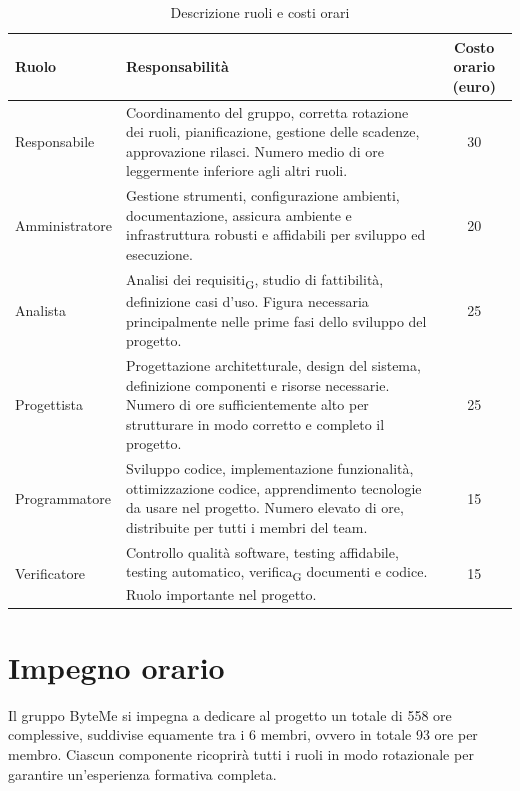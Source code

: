 \documentclass[11pt,a4paper]{article}
\newcommand{\gls}[1]{#1\textsubscript{G}}
\begin{document}
\begin{table}[H]
    \centering
    \begin{tabular}{|p{}|p{}|c|}
        \hline
        \textbf{Ruolo} & \textbf{Responsabilità} & \textbf{Costo orario (euro)} \\
        \hline
        Responsabile & Coordinamento del gruppo, corretta rotazione dei ruoli, pianificazione, gestione delle scadenze, approvazione rilasci. Numero medio di ore leggermente inferiore agli altri ruoli. & 30 \\
        \hline
        Amministratore & Gestione strumenti, configurazione ambienti, documentazione, assicura ambiente e infrastruttura robusti e affidabili per sviluppo ed esecuzione. & 20 \\
        \hline
        Analista & \gls{Analisi dei requisiti}, studio di fattibilità, definizione casi d'uso. Figura necessaria principalmente nelle prime fasi dello sviluppo del progetto. & 25 \\
        \hline
        Progettista & Progettazione architetturale, design del sistema, definizione componenti e risorse necessarie. Numero di ore sufficientemente alto per strutturare in modo corretto e completo il progetto. & 25 \\
        \hline
        Programmatore & Sviluppo codice, implementazione funzionalità, ottimizzazione codice, apprendimento tecnologie da usare nel progetto. Numero elevato di ore, distribuite per tutti i membri del team. & 15 \\
        \hline
        Verificatore & Controllo qualità software, testing affidabile, testing automatico, \gls{verifica} documenti e codice. Ruolo importante nel progetto. & 15 \\
        \hline
    \end{tabular}
    \caption{Descrizione ruoli e costi orari}
\end{table}
\newpage

\section{Impegno orario}
Il gruppo ByteMe si impegna a dedicare al progetto un totale di 558 ore complessive, suddivise equamente tra i 6 membri, ovvero in totale 93 ore per membro. Ciascun componente ricoprirà tutti i ruoli in modo rotazionale per garantire un'esperienza formativa completa.
\end{document}
